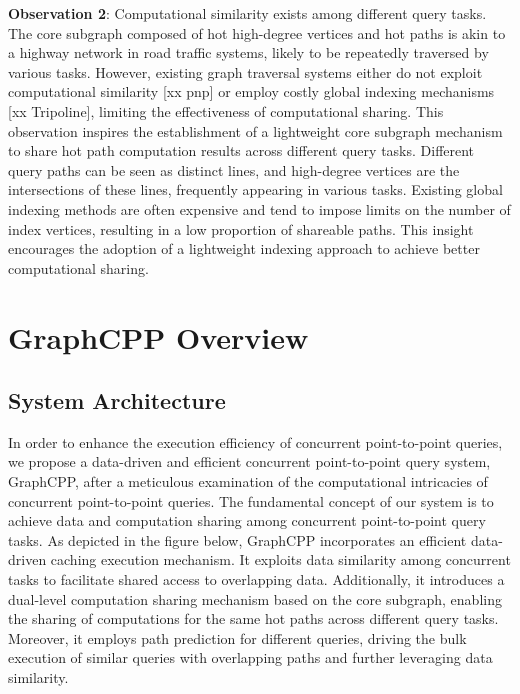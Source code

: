 \documentclass[lettersize,journal]{IEEEtran} %
\begin{document}
{\bf{Observation 2}}: Computational similarity exists among different query tasks. The core subgraph composed of hot high-degree vertices and hot paths is akin to a highway network in road traffic systems, likely to be repeatedly traversed by various tasks. However, existing graph traversal systems either do not exploit computational similarity [xx pnp] or employ costly global indexing mechanisms [xx Tripoline], limiting the effectiveness of computational sharing. This observation inspires the establishment of a lightweight core subgraph mechanism to share hot path computation results across different query tasks. Different query paths can be seen as distinct lines, and high-degree vertices are the intersections of these lines, frequently appearing in various tasks. Existing global indexing methods are often expensive and tend to impose limits on the number of index vertices, resulting in a low proportion of shareable paths. This insight encourages the adoption of a lightweight indexing approach to achieve better computational sharing.

\section{GraphCPP Overview}

\subsection{System Architecture}
In order to enhance the execution efficiency of concurrent point-to-point queries, we propose a data-driven and efficient concurrent point-to-point query system, GraphCPP, after a meticulous examination of the computational intricacies of concurrent point-to-point queries. The fundamental concept of our system is to achieve data and computation sharing among concurrent point-to-point query tasks. As depicted in the figure below, GraphCPP incorporates an efficient data-driven caching execution mechanism. It exploits data similarity among concurrent tasks to facilitate shared access to overlapping data. Additionally, it introduces a dual-level computation sharing mechanism based on the core subgraph, enabling the sharing of computations for the same hot paths across different query tasks. Moreover, it employs path prediction for different queries, driving the bulk execution of similar queries with overlapping paths and further leveraging data similarity.
\end{document}
